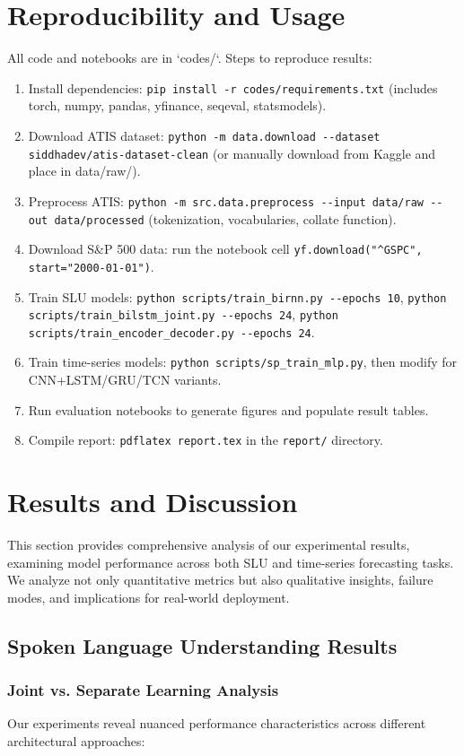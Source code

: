 \documentclass[conference]{IEEEtran}
\begin{document}
\section{Reproducibility and Usage}
All code and notebooks are in `codes/`. Steps to reproduce results:
\begin{enumerate}
  \item Install dependencies: \verb|pip install -r codes/requirements.txt| (includes torch, numpy, pandas, yfinance, seqeval, statsmodels).
  \item Download ATIS dataset: \verb|python -m data.download --dataset siddhadev/atis-dataset-clean| (or manually download from Kaggle and place in data/raw/).
  \item Preprocess ATIS: \verb|python -m src.data.preprocess --input data/raw --out data/processed| (tokenization, vocabularies, collate function).
  \item Download S\&P 500 data: run the notebook cell \verb|yf.download("^GSPC", start="2000-01-01")|.
  \item Train SLU models: \verb|python scripts/train_birnn.py --epochs 10|, \verb|python scripts/train_bilstm_joint.py --epochs 24|, \verb|python scripts/train_encoder_decoder.py --epochs 24|.
  \item Train time-series models: \verb|python scripts/sp_train_mlp.py|, then modify for CNN+LSTM/GRU/TCN variants.
  \item Run evaluation notebooks to generate figures and populate result tables.
  \item Compile report: \verb|pdflatex report.tex| in the \verb|report/| directory.
\end{enumerate}

\section{Results and Discussion}

This section provides comprehensive analysis of our experimental results, examining model performance across both SLU and time-series forecasting tasks. We analyze not only quantitative metrics but also qualitative insights, failure modes, and implications for real-world deployment.

\subsection{Spoken Language Understanding Results}

\subsubsection{Joint vs. Separate Learning Analysis}
Our experiments reveal nuanced performance characteristics across different architectural approaches:
\end{document}
